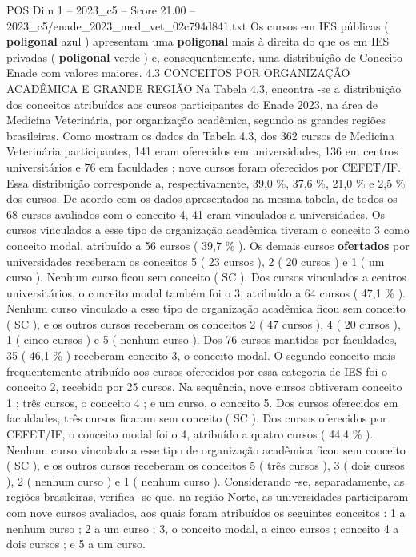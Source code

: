 \begin{textsample}{POS Dim 1 – 2023\_c5 – Score 21.00 – 2023\_c5/enade\_2023\_med\_vet\_02c794d841.txt}
Os cursos em IES públicas ( \textbf{poligonal} azul ) apresentam uma \textbf{poligonal} mais à direita do que os em IES privadas ( \textbf{poligonal} verde ) e, consequentemente, uma distribuição de Conceito Enade com valores maiores. 4.3 CONCEITOS POR ORGANIZAÇÃO ACADÊMICA E GRANDE REGIÃO Na Tabela 4.3, encontra -se a distribuição dos conceitos atribuídos aos cursos participantes do Enade 2023, na área de Medicina Veterinária, por organização acadêmica, segundo as grandes regiões brasileiras.
Como mostram os dados da Tabela 4.3, dos 362 cursos de Medicina Veterinária participantes, 141 eram oferecidos em universidades, 136 em centros universitários e 76 em faculdades ; nove cursos foram oferecidos por CEFET/IF.
Essa distribuição corresponde a, respectivamente, 39,0 \%, 37,6 \%, 21,0 \% e 2,5 \% dos cursos.
De acordo com os dados apresentados na mesma tabela, de todos os 68 cursos avaliados com o conceito 4, 41 eram vinculados a universidades.
Os cursos vinculados a esse tipo de organização acadêmica tiveram o conceito 3 como conceito modal, atribuído a 56 cursos ( 39,7 \% ).
Os demais cursos \textbf{ofertados} por universidades receberam os conceitos 5 ( 23 cursos ), 2 ( 20 cursos ) e 1 ( um curso ).
Nenhum curso ficou sem conceito ( SC ).
Dos cursos vinculados a centros universitários, o conceito modal também foi o 3, atribuído a 64 cursos ( 47,1 \% ).
Nenhum curso vinculado a esse tipo de organização acadêmica ficou sem conceito ( SC ), e os outros cursos receberam os conceitos 2 ( 47 cursos ), 4 ( 20 cursos ), 1 ( cinco cursos ) e 5 ( nenhum curso ).
Dos 76 cursos mantidos por faculdades, 35 ( 46,1 \% ) receberam conceito 3, o conceito modal.
O segundo conceito mais frequentemente atribuído aos cursos oferecidos por essa categoria de IES foi o conceito 2, recebido por 25 cursos.
Na sequência, nove cursos obtiveram conceito 1 ; três cursos, o conceito 4 ; e um curso, o conceito 5.
Dos cursos oferecidos em faculdades, três cursos ficaram sem conceito ( SC ).
Dos cursos oferecidos por CEFET/IF, o conceito modal foi o 4, atribuído a quatro cursos ( 44,4 \% ).
Nenhum curso vinculado a esse tipo de organização acadêmica ficou sem conceito ( SC ), e os outros cursos receberam os conceitos 5 ( três cursos ), 3 ( dois cursos ), 2 ( nenhum curso ) e 1 ( nenhum curso ).
Considerando -se, separadamente, as regiões brasileiras, verifica -se que, na região Norte, as universidades participaram com nove cursos avaliados, aos quais foram atribuídos os seguintes conceitos : 1 a nenhum curso ; 2 a um curso ; 3, o conceito modal, a cinco cursos ; conceito 4 a dois cursos ; e 5 a um curso.

\end{textsample}
